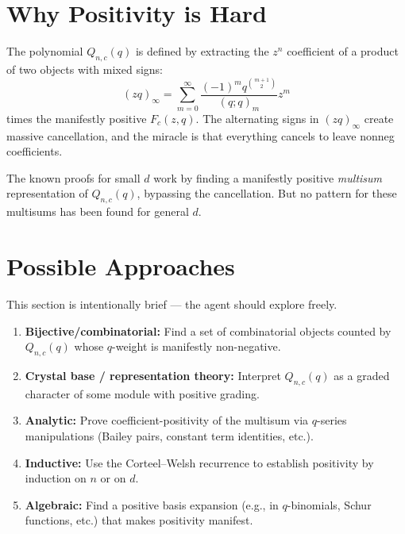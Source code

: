 \documentclass[11pt]{article}
\begin{document}
\section{Why Positivity is Hard}

The polynomial $Q_{n,c}(q)$ is defined by extracting the $z^n$ coefficient of a product of two objects with mixed signs:
\[
(zq)_\infty = \sum_{m=0}^\infty \frac{(-1)^m q^{\binom{m+1}{2}}}{(q;q)_m} z^m
\]
times the manifestly positive $F_c(z,q)$. The alternating signs in $(zq)_\infty$ create massive cancellation, and the miracle is that everything cancels to leave nonneg coefficients.

The known proofs for small $d$ work by finding a manifestly positive \emph{multisum} representation of $Q_{n,c}(q)$, bypassing the cancellation. But no pattern for these multisums has been found for general $d$.

\section{Possible Approaches}

This section is intentionally brief — the agent should explore freely.

\begin{enumerate}
\item \textbf{Bijective/combinatorial:} Find a set of combinatorial objects counted by $Q_{n,c}(q)$ whose $q$-weight is manifestly non-negative.
\item \textbf{Crystal base / representation theory:} Interpret $Q_{n,c}(q)$ as a graded character of some module with positive grading.
\item \textbf{Analytic:} Prove coefficient-positivity of the multisum via $q$-series manipulations (Bailey pairs, constant term identities, etc.).
\item \textbf{Inductive:} Use the Corteel--Welsh recurrence to establish positivity by induction on $n$ or on $d$.
\item \textbf{Algebraic:} Find a positive basis expansion (e.g., in $q$-binomials, Schur functions, etc.) that makes positivity manifest.
\end{enumerate}
\end{document}

